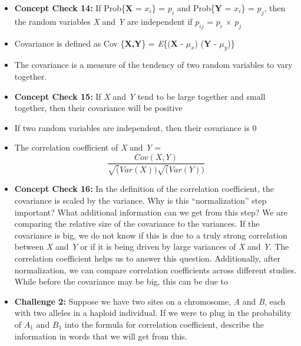 \documentclass[12pt]{report}
\begin{document}
\begin{itemize}

\item \textbf{Concept Check 14:} If Prob\{\textbf{X} = \textit{$x_{i}$}\} = $p_{i}$ and Prob\{\textbf{Y} = $x_{i}$\} = \textit{$p_{j}$}, then the random variables \textit{X} and \textit{Y} are independent if \textit{$p_{ij}$} = \color{red} \textit{$p_{i}$} $\times$ \textit{$p_{j}$}

\color{black}

\item Covariance is defined as Cov \{\textbf{X,Y}\} =  \textit{E}\{\big($\textbf{X - $\mu_{x}$}$\big) \big($\textbf{Y - $\mu_{y}$}$\big)\}

\item The covariance is a measure of the tendency of two random variables to vary together. 

\bigskip
\item \textbf{Concept Check 15:} If \textit{X} and \textit{Y} tend to be large together and small together, then their covariance will be \color{red} positive

\color{black}

\item If two random variables are independent, then their covariance is \color{red} 0 \color{black}

\item The correlation coefficient of \textit{X} and \textit{Y} = \[\frac{Cov(X, Y)}{\sqrt(Var (X))\sqrt(Var (Y))} \] 

\bigskip
\item \textbf{Concept Check 16:} In the definition of the correlation coefficient, the covariance is scaled by the variance. Why is this ``normalization'' step important? What additional information can we get from this step? \color{red} We are comparing the relative size of the covariance to the variances. If the covariance is big, we do not know if this is due to a truly strong correlation between \textit{X} and \textit{Y} or if it is being driven by large variances of  \textit{X} and \textit{Y}. The correlation coefficient helps us to answer this question. Additionally, after normalization, we can compare correlation coefficients across different studies. While before the covariance may be big, this can be due to 

\color{black}

\bigskip
\item \textbf{Challenge 2:} Suppose we have two sites on a chromosome, \textit{A} and \textit{B}, each with two alleles in a haploid individual. If we were to plug in the probability of \textit{$A_{1}$} and \textit{$B_{1}$} into the formula for correlation coefficient, describe the information in words that we will get from this.


\end{itemize}
\end{document}
